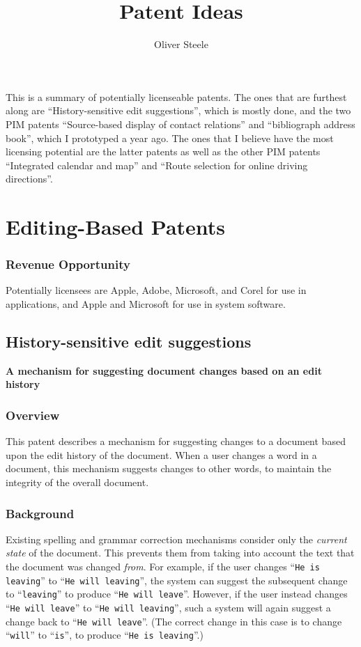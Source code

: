 \documentclass{article}
\newcommand{\ptitle}[1]{\textbf{#1}}
\newcommand{\pbackground}{\subsubsection{Background}}
\newcommand{\poverview}{\subsubsection{Overview}}
\newcommand{\prevenue}{\subsubsection{Revenue Opportunity}}
\newcommand{\sentence}[1]{``\texttt{#1}''}
\begin{document}
\title{Patent Ideas}
\author{Oliver Steele}
\maketitle

This is a summary of potentially licenseable patents.  The ones that are furthest along are ``History-sensitive edit suggestions'', which is mostly done, and the two PIM patents ``Source-based display of contact relations'' and ``bibliograph address book'', which I prototyped a year ago.  The ones that I believe have the most licensing potential are the latter patents as well as the other PIM patents ``Integrated calendar and map'' and ``Route selection for online driving directions''.


\section{Editing-Based Patents}

\prevenue
Potentially licensees are Apple, Adobe, Microsoft, and Corel for use in applications, and Apple and Microsoft for use in system software.

\subsection{History-sensitive edit suggestions}

\ptitle{A mechanism for suggesting document changes based on an edit history}

\poverview
This patent describes a mechanism for suggesting changes to a document based upon the edit history of the document.  When a user changes a word in a document, this mechanism suggests changes to other words, to maintain the integrity of the overall document.

\pbackground
Existing spelling and grammar correction mechanisms consider only the \emph{current state} of the document.  This prevents them from taking into account the text that the document was changed \emph{from}.  For example, if the user changes \sentence{He is leaving} to \sentence{He will leaving}, the system can suggest the subsequent change to \sentence{leaving} to produce \sentence{He will leave}.  However, if the user instead changes \sentence{He will leave} to \sentence{He will leaving}, such a system will again suggest a change back to \sentence{He will leave}.  (The correct change in this case is to change \sentence{will} to \sentence{is}, to produce \sentence{He is leaving}.)
\end{document}
